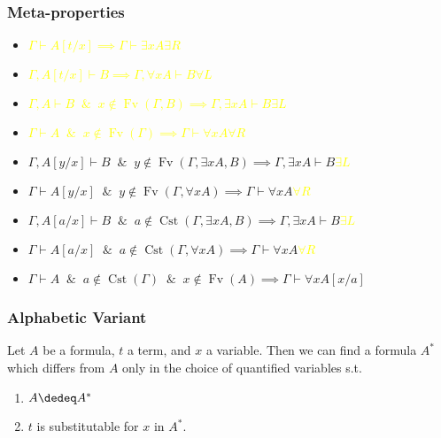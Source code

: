 \documentclass[UTF8,11pt,colorlinks,compress,openany]{beamer}%
\begin{document}
\begin{frame}\frametitle{Meta-properties}
	\begin{itemize}
		\item \textcolor{yellow}{$\Gamma\vdash A[t/x]\implies\Gamma\vdash\exists x A$\hfill $\exists R$}
		\item \textcolor{yellow}{$\Gamma, A[t/x]\vdash B\implies\Gamma,\forall x A\vdash B$\hfill $\forall L$}
		\item \textcolor{yellow}{$\Gamma, A\vdash B\;\;\&\;\;x\notin \operatorname{Fv}(\Gamma,B)\implies\Gamma,\exists x A\vdash B$\hfill $\exists L$}
		\item \textcolor{yellow}{$\Gamma\vdash A\;\;\&\;\;x\notin\operatorname{Fv}(\Gamma)\implies\Gamma\vdash\forall x A$\hfill $\forall R$}
		\item $\Gamma, A[y/x]\vdash B\;\;\&\;\;y\notin \operatorname{Fv}(\Gamma,\exists x A, B)\implies\Gamma,\exists x A\vdash B$\hfill \textcolor{yellow}{$\exists L$}
		\item $\Gamma\vdash A[y/x]\;\;\&\;\;y\notin\operatorname{Fv}(\Gamma,\forall x A)\implies\Gamma\vdash\forall x A$\hfill \textcolor{yellow}{$\forall R$}
		\item $\Gamma, A[a/x]\vdash B\;\;\&\;\;a\notin\operatorname{Cst}(\Gamma,\exists x A, B)\implies\Gamma,\exists x A\vdash B$\hfill \textcolor{yellow}{$\exists L$}
		\item $\Gamma\vdash A[a/x]\;\;\&\;\;a\notin\operatorname{Cst}(\Gamma,\forall x A)\implies\Gamma\vdash\forall x A$\hfill \textcolor{yellow}{$\forall R$}
		\item $\Gamma\vdash A\;\;\&\;\;a\notin\operatorname{Cst}(\Gamma)\;\;\&\;\; x\notin\operatorname{Fv}(A)\implies\Gamma\vdash\forall x A[x/a]$
	\end{itemize}
\end{frame}

\begin{frame}\frametitle{Alphabetic Variant}
	\begin{theorem}
		Let $A$ be a formula, $t$ a term, and $x$ a variable. Then we can find a formula $A^*$ which differs from $A$ only in the choice of quantified variables s.t.
		\begin{enumerate}
			\item $A\dedeq A^*$
			\item $t$ is substitutable for $x$ in $A^*$.
		\end{enumerate}
	\end{theorem}
\end{frame}
\end{document}
